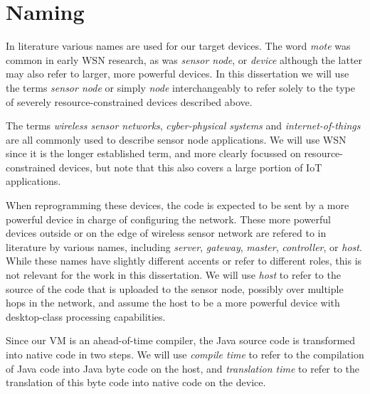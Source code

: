 \section{Naming}
In literature various names are used for our target devices. The word \emph{mote} was common in early WSN research, as was \emph{sensor node}, or \emph{device} although the latter may also refer to larger, more powerful devices. In this dissertation we will use the terms \emph{sensor node} or simply \emph{node} interchangeably to refer solely to the type of severely resource-constrained devices described above.

The terms \emph{wireless sensor networks}, \emph{cyber-physical systems} and \emph{internet-of-things} are all commonly used to describe sensor node applications. We will use WSN since it is the longer established term, and more clearly focussed on resource-constrained devices, but note that this also covers a large portion of IoT applications.

When reprogramming these devices, the code is expected to be sent by a more powerful device in charge of configuring the network. These more powerful devices outside or on the edge of wireless sensor network are refered to in literature by various names, including \emph{server}, \emph{gateway}, \emph{master}, \emph{controller}, or \emph{host}. While these names have slightly different accents or refer to different roles, this is not relevant for the work in this dissertation. We will use \emph{host} to refer to the source of the code that is uploaded to the sensor node, possibly over multiple hops in the network, and assume the host to be a more powerful device with desktop-class processing capabilities.

Since our VM is an ahead-of-time compiler, the Java source code is transformed into native code in two steps. We will use \emph{compile time} to refer to the compilation of Java code into Java byte code on the host, and \emph{translation time} to refer to the translation of this byte code into native code on the device.
